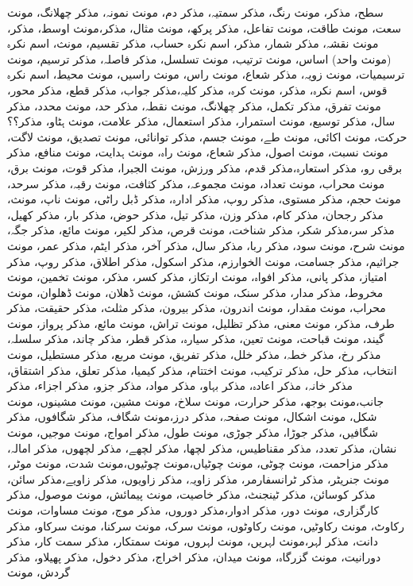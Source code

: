 سطح، مذکر، مونث
رنگ، مذکر
سمتیہ، مذکر
دم، مونث
نمونہ، مذکر
چھلانگ، مونث
سعت، مونث
طاقت، مونث
تفاعل، مذکر
پرکھ، مونث
مثال، مذکر،مونث
اوسط، مذکر، مونث
نقشہ، مذکر
شمار، مذکر، اسم نکرہ
حساب، مذکر
تقسیم، مونث، اسم نکرہ (مونث واحد)
اساس، مونث
ترتیب، مونث
تسلسل، مذکر
فاصلہ، مذکر
ترسیم، مونث
ترسیمیات، مونث
زویہ، مذکر
شعاع، مونث
راس، مونث
راسیں، مونث
محیط، اسم نکرہ
قوس، اسم نکرہ، مذکر، مونث
کرہ، مذکر
کلیہ،مذکر
جواب، مذکر
قطع، مذکر
محور، مونث
تفرق، مذکر
تکمل، مذکر
چھلانگ، مونث
نقطہ، مذکر
حد، مونث
محدد، مذکر
سال، مذکر
توسیع، مونث
استمرار، مذکر
استعمال، مذکر
علامت، مونث
ہٹاو، مذکر؟؟
حرکت، مونث
اکائی، مونث
طے، مونث
جسم، مذکر
توانائی، مونث
تصدیق، مونث
لاگت، مونث
نسبت، مونث
اصول، مذکر
شعاع، مونث
راہ، مونث
ہدایت، مونث
منافع، مذکر
برقی رو، مذکر
استعارہ،مذکر
قدم، مذکر
ورزش، مونث
الجبرا، مذکر
قوت، مونث
برق، مونث
محراب، مونث
تعداد، مونث
مجموعہ، مذکر
کثافت، مونث
رقبہ، مذکر
سرحد، مونث
حجم، مذکر
مستوی، مذکر
روپ، مذکر
ادارہ، مذکر
ڈبل راٹی، مونث
ناپ، مونث، مذکر
رجحان، مذکر
کام، مذکر
وزن، مذکر
تیل، مذکر
حوض، مذکر
بار، مذکر
کھیل، مذکر
سر،مذکر
شکر، مذکر
شناخت، مونث
 قرص، مذکر
لکیر، مونث
مائع، مذکر
جگہ، مونث
شرح، مونث
سود، مذکر
ربا، مذکر
سال، مذکر
آخر، مذکر
ایٹم، مذکر
عمر، مونث
جراثیم، مذکر
جسامت، مونث
الخوارزم، مذکر
اسکول، مذکر
اطلاق، مذکر
روپ، مذکر
امتیاز، مذکر
پانی، مذکر
افواہ، مونث
ارتکاز، مذکر
کسر، مذکر، مونث
تخمین، مونث
مخروط، مذکر
مدار، مذکر
سنک، مونث
کشش، مونث
ڈھلان، مونث
ڈھلوان، مونث
محراب، مونث
مقدار، مونث
اندرون، مذکر
بیرون، مذکر
مثلث، مذکر
حقیقت، مذکر
طرف، مذکر، مونث
معنی، مذکر
تظلیل، مونث
تراش، مونث
مائع، مذکر
پرواز، مونث
گیند، مونث
قباحت، مونث
تعین، مذکر
سیارہ، مذکر
قطر، مذکر
چاند، مذکر
سلسلہ، مذکر
رخ، مذکر
خطہ، مذکر
خلل، مذکر
تفریق، مونث
مربع، مذکر
مستطیل، مونث
انتخاب، مذکر
حل، مذکر
ترکیب، مونث
اختتام، مذکر
کیمیا، مذکر
تعلق، مذکر
اشتقاق، مذکر
خانہ، مذکر
اعادہ، مذکر
بہاو، مذکر
مواد، مذکر
جزو، مذکر
اجزاء، مذکر
جانب،مونث
بوجھ، مذکر
حرارت، مونث
سلاخ، مونث
مشین، مونث
مشینوں، مونث
شکل، مونث
اشکال، مونث
صفحہ، مذکر
درز،مونث
شگاف، مذکر
شگافوں، مذکر
شگافیں، مذکر
جوڑا، مذکر
جوڑی، مونث
طول، مذکر
امواج، مونث
موجیں، مونث
نشان، مذکر
تعدد، مذکر
مقناطیس، مذکر
لچھا، مذکر
لچھے، مذکر
لچھوں، مذکر
امالہ، مذکر
مزاحمت، مونث
چوٹی، مونث
چوٹیاں،مونث
چوٹیوں،مونث
شدت، مونث
موٹر، مونث
جنریٹر، مذکر
ٹرانسفارمر، مذکر
زاویہ، مذکر
زاویوں، مذکر
زاویے،مذکر
سائن، مذکر
کوسائن، مذکر
ٹینجنٹ، مذکر
خاصیت، مونث
پیمائش، مونث
موصول، مذکر
کارگزاری، مونث
دور، مذکر
ادوار،مذکر
دوروں، مذکر
موج، مونث
مساوات، مونث
رکاوٹ، مونث
رکاوٹیں، مونث
رکاوٹوں، مونث
سرک، مونث
سرکنا، مونث
سرکاو، مذکر
دانت، مذکر
لہر،مونث
لہریں، مونث
لہروں، مونث
سمتکار، مذکر
سمت کار، مذکر
دورانیت، مونث
گزرگاہ، مونث
میدان، مذکر
اخراج، مذکر
دخول، مذکر
پھیلاو، مذکر
گردش، مونث


